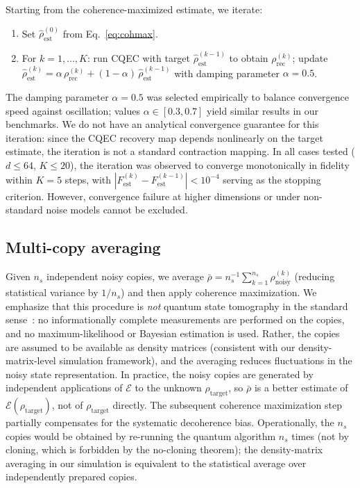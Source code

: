 \documentclass[pra,twocolumn,superscriptaddress,longbibliography,floatfix,nofootinbib]{revtex4-2}
\newcommand{\EE}{\mathcal{E}}
\newcommand{\Fest}{F_\mathrm{est}}
\newcommand{\rhot}{\rho_\mathrm{target}}
\newcommand{\rhon}{\rho_\mathrm{noisy}}
\newcommand{\rhor}{\rho_\mathrm{rec}}
\newcommand{\rhoe}{\hat{\rho}_\mathrm{est}}
\begin{document}
Starting from the coherence-maximized estimate, we iterate:
\begin{enumerate}
\item Set $\rhoe^{(0)}$ from Eq.~\eqref{eq:cohmax}.
\item For $k = 1, \ldots, K$: run CQEC with target $\rhoe^{(k-1)}$ to obtain $\rhor^{(k)}$; update $\rhoe^{(k)} = \alpha\,\rhor^{(k)} + (1-\alpha)\,\rhoe^{(k-1)}$ with damping parameter $\alpha = 0.5$.
\end{enumerate}
The damping parameter $\alpha = 0.5$ was selected empirically to balance convergence speed against oscillation; values $\alpha \in [0.3, 0.7]$ yield similar results in our benchmarks.
We do not have an analytical convergence guarantee for this iteration: since the CQEC recovery map depends nonlinearly on the target estimate, the iteration is not a standard contraction mapping.
In all cases tested ($d \leq 64$, $K \leq 20$), the iteration was observed to converge monotonically in fidelity within $K = 5$ steps, with $|\Fest^{(k)} - \Fest^{(k-1)}| < 10^{-4}$ serving as the stopping criterion.
However, convergence failure at higher dimensions or under non-standard noise models cannot be excluded.

\subsection{Multi-copy averaging}
\label{sec:multicopy}

Given $n_s$ independent noisy copies, we average $\bar\rho = n_s^{-1}\sum_{k=1}^{n_s} \rhon^{(k)}$ (reducing statistical variance by $1/n_s$) and then apply coherence maximization.
We emphasize that this procedure is \emph{not} quantum state tomography in the standard sense~\cite{Hradil1997,Haah2017}: no informationally complete measurements are performed on the copies, and no maximum-likelihood or Bayesian estimation is used.
Rather, the copies are assumed to be available as density matrices (consistent with our density-matrix-level simulation framework), and the averaging reduces fluctuations in the noisy state representation.
In practice, the noisy copies are generated by independent applications of $\EE$ to the unknown $\rhot$, so $\bar\rho$ is a better estimate of $\EE(\rhot)$, not of $\rhot$ directly.
The subsequent coherence maximization step partially compensates for the systematic decoherence bias.
Operationally, the $n_s$ copies would be obtained by re-running the quantum algorithm $n_s$ times (not by cloning, which is forbidden by the no-cloning theorem); the density-matrix averaging in our simulation is equivalent to the statistical average over independently prepared copies.
\end{document}
